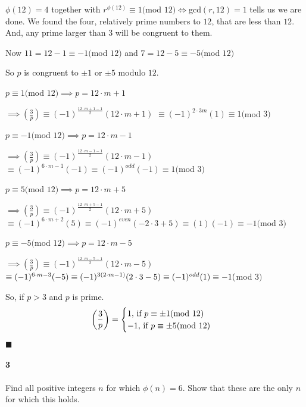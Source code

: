 \documentclass{article}
\begin{document}
$\phi(12) = 4$ together with $r^{\phi(12)}\equiv 1 ($mod $12) \iff
$gcd$(r,12) = 1$ tells us we are done. We found the four, relatively
prime numbers to $12$, that are less than $12$. And, any prime larger
than $3$ will be congruent to them.

Now $11 = 12 - 1 \equiv -1 ($mod $12)$ and $7 = 12 - 5 \equiv - 5 ($mod
$12)$

So $p$ is congruent to $\pm 1$ or $\pm 5$ modulo $12$.

$p \equiv 1 ($mod $12) \implies p = 12\cdot m + 1$

$\implies \left(\frac{3}{p}\right) \equiv (-1)^{\frac{12\cdot m +1 -1}{2}}
(12\cdot m +1)$
$\equiv (-1)^{2\cdot 3m}
(1)
\equiv 1 ($mod $3)$


$p \equiv -1 ($mod $12) \implies p = 12\cdot m - 1$

$\implies \left(\frac{3}{p}\right) \equiv (-1)^{\frac{12\cdot m -1 -1}{2}}
(12\cdot m -1)$
$\equiv (-1)^{6\cdot m -1}
(-1)
\equiv (-1)^{odd}(-1) \equiv 1 ($mod $3)$


$p \equiv 5 ($mod $12) \implies p = 12\cdot m + 5$

$\implies \left(\frac{3}{p}\right) \equiv (-1)^{\frac{12\cdot m +5 -1}{2}}
(12\cdot m +5)$
$\equiv (-1)^{6\cdot m + 2}
(5)
\equiv (-1)^{even}(-2\cdot 3 + 5) \equiv (1)(-1) \equiv -1 ($mod $3)$

$p \equiv -5 ($mod $12) \implies p = 12\cdot m - 5$

$\implies \left(\frac{3}{p}\right) \equiv (-1)^{\frac{12\cdot m -5 -1}{2}}
(12\cdot m -5)$
$\equiv (-1)^{6\cdot m - 3}
(-5)\\
\equiv (-1)^{3(2\cdot m - 1)}(2\cdot 3 - 5) \equiv (-1)^{odd}(1) \equiv -1 ($mod $3)$

So, if $p > 3$ and $p$ is prime.
\[\left(\frac{3}{p}\right) = \begin{cases} 1, $ if $ p\equiv \pm 1
    ($mod $ 12)\\ -1, $ if $ p\equiv \pm 5
    ($mod $ 12)
  \end{cases}\]

\vspace{0.618 em}
$\blacksquare$


\newpage
\paragraph{3} Find all positive integers $n$ for which $\phi(n) =
6$. Show that these are the only $n$ for which this holds.

\vspace{0.618 em}
\end{document}
